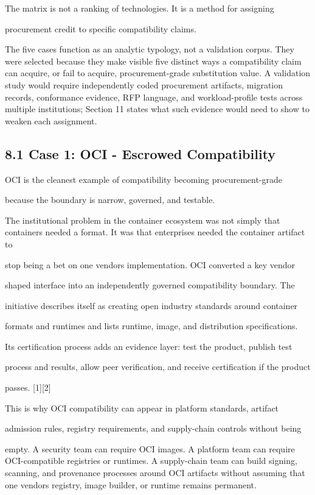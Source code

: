 \documentclass[11pt]{article}
\begin{document}
The matrix is not a ranking of technologies. It is a method for assigning

procurement credit to specific compatibility claims.

The five cases function as an analytic typology, not a validation corpus. They were selected because they make visible five distinct ways a compatibility claim can acquire, or fail to acquire, procurement-grade substitution value. A validation study would require independently coded procurement artifacts, migration records, conformance evidence, RFP language, and workload-profile tests across multiple institutions; Section 11 states what such evidence would need to show to weaken each assignment.

\subsection{8.1 Case 1: OCI - Escrowed Compatibility}\label{case-1-oci-escrowed-compatibility}

OCI is the cleanest example of compatibility becoming procurement-grade

because the boundary is narrow, governed, and testable.

The institutional problem in the container ecosystem was not simply that containers needed a format. It was that enterprises needed the container artifact to

stop being a bet on one vendor\textquotesingle s implementation. OCI converted a key vendor

shaped interface into an independently governed compatibility boundary. The

initiative describes itself as creating open industry standards around container

formats and runtimes and lists runtime, image, and distribution specifications.

Its certification process adds an evidence layer: test the product, publish test

process and results, allow peer verification, and receive certification if the product

passes. {[}1{]}{[}2{]}

This is why OCI compatibility can appear in platform standards, artifact

admission rules, registry requirements, and supply-chain controls without being

empty. A security team can require OCI images. A platform team can require OCI-compatible registries or runtimes. A supply-chain team can build signing, scanning, and provenance processes around OCI artifacts without assuming that one vendor\textquotesingle s registry, image builder, or runtime remains permanent.
\end{document}
